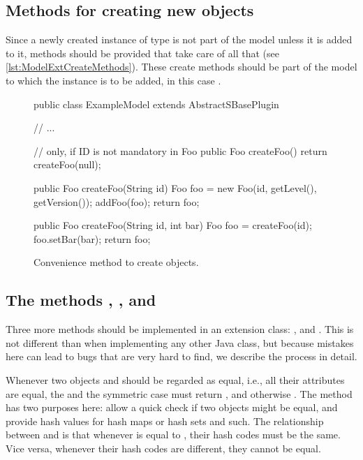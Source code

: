 \subsection{Methods for creating new objects}

Since a newly created instance of type  is not part of the model
unless it is added to it,  methods should be provided that
take care of all that (see \vref{lst:ModelExtCreateMethods}).
These create methods should be part of the model to which the 
instance is to be added, in this case .

\begin{figure}[thb]
  \begin{example}[numbers=left]
public class ExampleModel extends AbstractSBasePlugin {

  // ...

  // only, if ID is not mandatory in Foo
  public Foo createFoo() {
    return createFoo(null);
  }

  public Foo createFoo(String id) {
    Foo foo = new Foo(id, getLevel(), getVersion());
    addFoo(foo);
    return foo;
  }

  public Foo createFoo(String id, int bar) {
    Foo foo = createFoo(id);
    foo.setBar(bar);
    return foo;
  }
}\end{example}
  \caption{Convenience method to create  objects.}
  \label{lst:ModelExtCreateMethods}
\end{figure}


\subsection{The methods , , and }

Three more methods should be implemented in an extension
class: ,  and .  This is not
different than when implementing any other Java class, but because mistakes
here can lead to bugs that are very hard to find, we describe the process in
detail.

Whenever two objects  and  should be regarded as equal,
i.e., all their attributes are equal, the  and the
symmetric case  must return , and otherwise
. The  method has two purposes here: allow a
quick check if two objects might be equal, and provide hash values for hash
maps or hash sets and such. The relationship between  and
 is that whenever  is equal to , their
hash codes must be the same. Vice versa, whenever their hash codes are
different, they cannot be equal.

